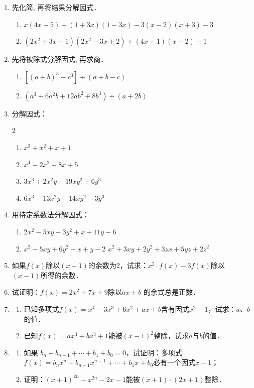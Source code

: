 \begin{enumerate}
\item 先化简, 再将结果分解因式．
\begin{enumerate}
    \item  $x(4 x-5)+(1+3 x)(1-3 x)-3(x-2)(x+3)-3$
\item  $\left(2 x^{2}+3 x-1\right)\left(2 x^{2}-3 x+2\right)+(4 x-1)(x-2)-1$
\end{enumerate}

\item 先将被除式分解因式, 再求商．
\begin{enumerate}
    \item $\left[(a+b)^{3}-c^{3}\right]\div (a+b-c)$
\item $\left(a^{3}+6 a^{2} b+12 a b^{2}+8 b^{3}\right)\div (a+2 b)$
\end{enumerate}

\item 分解因式：
\begin{multicols}{2}
\begin{enumerate}
    \item $x^{3}+x^{2}+x+1$
\item $x^{4}-2 x^{2}+8 x+5$ 
\item $3 x^{3}+2 x^{2} y-19 x {y}^{2}+6 y^{3}$
\item $6 x^{3}-13 x^{2} y-14 x y^{2}-3 y^{3}$
\end{enumerate}
\end{multicols}
\item 用待定系数法分解因式：
\begin{enumerate}
\item $2 x^{2}-5 x y-3 y^{2}+x+11 y-6$
\item $x^{2}-5 x y+6 y^{2}-x+y-2 $
\staritem $x^{2}+3 x y+2 y^{2}+3 z x+5 yz+2 z^{2}$
\end{enumerate}


\item 如果$f(x)$除以$(x-1)$的余数为2，试求：$x^2\cdot f(x)-3f(x)$除以$(x-1)$所得的余数．

\item 试证明：$f(x)=2x^2+7x+9$除以$ax+b$ 的余式总是正数．
\item 
\begin{enumerate}
\item 已知多项式$f(x)=x^4-3x^3+6x^2+ax+b$含有因式$x^2-1$，试求：$a$、$b$的值．
\item 已知$f(x)=ax^4+bx^3+1$能被$(x-1)^2$整除，试求$a$与$b$的值．
\end{enumerate}

\item 
\begin{enumerate}
\item 如果 $b_n+b_{n-1}+\cdots+b_1+b_0=0$，试证明：多项式$f(x)=b_nx^n+b_{n-1}x^{n-1}+\cdots+b_1x+b_0$必有一个因式$x-1$；
\item 证明：$(x+1)^{2n}-x^{2n}-2x-1$能被$(x+1)\cdot (2x+1)$整除．
\end{enumerate}


\end{enumerate}
